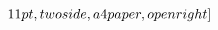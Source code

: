 \[11pt, twoside, a4paper, openright]




\graphicspath {{{{{{\figures/intro/}}}

\n-Chapter{\ to cosmology}
\minitoc
\newpage
\thisispagestyle{fancy}

The purpose of this first chapter is to introduce modern cosmology and briefly explain its construction over the last century. The idea is to give an overview of the current paradigm, while further detailing the key points needed for this manuscript. For an in-depth study of modern cosmology, we refer the reader to the following books:~\citet{Rich2010},~\citet{Dodelson2003}. 

\Section, "What Is Cosmology?
The term cosmogony (from the Greek \emph{cosmo-}: world; \emph{gon-}: to engender) refers to a conception and attempt to explain the birth of the world, and sometimes of man. There are a large number of cosmogonies, very often of religious origins. We can cite for example the Hindu cosmogony, in which the world is seen as a cycle: the god Brahma creates the world when he awakens, and destroys it when he falls asleep. Our universe thus corresponds to a day of Brahma, beginning when Brahma opens his eyes and ending when he closes them. The world thus follows a sequence of creation and destruction.
We can also quote the Abrahamic cosmogony, described in Genesis. This cosmogony is common to Judaism, Christianity, and Islam. In this cosmogony, the timeless creator god designed the world in 7 days. He began by creating light on the first day. He ended by creating Man in his own image on the sixth day, and then rested on the last day.
\begin{figure}
  \centering
  \includegraphics [scale=1]{cosmohindu.png}
  \Space.
  \includegraphics [scale=1]{genese.png}
  \nLeft: artistic illustration of Hindu cosmology. Right: cover of the book of Genesis, Bible of St. Paul Outside the Walls, circa 870.}
  \label...
\...end{figure}

We could spend the entire manuscript describing various cosmogonies. But the one we're interested in, and which we'll detail here, is the scientific cosmogony: \emph{cosmology}. Cosmology is therefore the study of the universe, its origin, its constituents and its future, within the framework of the scientific method. Even if today cosmology has a consensus among scientists regarding the understanding of the universe, this has not always been the case. For a long time, religious beliefs dominated, going so far as to limit or even prohibit scientific advances.
It wasn't until the 16th century that Copernicus proposed the heliocentric model, almost 2000 years after Aristotle's geocentric model, supported by the church and scientists until then.
Subsequently, Galileo's observations, Kepler's work and the emancipation of religious dogmas allowed the heliocentric model, based on Kepler's laws, to take hold. This also allowed Newton to propose his theory of gravitation shortly afterwards. This period marked the birth of physics and cosmology.

}}\]
